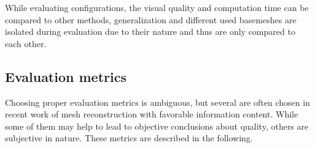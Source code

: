     While evaluating configurations, the visual quality and computation time can be compared to other methods, generalization and different used basemeshes
    are isolated during evaluation due to their nature and thus are only compared to each other.

\subsection{Evaluation metrics}

    Choosing proper evaluation metrics is ambiguous, but several are often chosen in recent work of mesh reconstruction with favorable information content. 
    While some of them may help to lead to objective conclusions about quality, others are subjective in nature. These metrics 
    are described in the following. 

